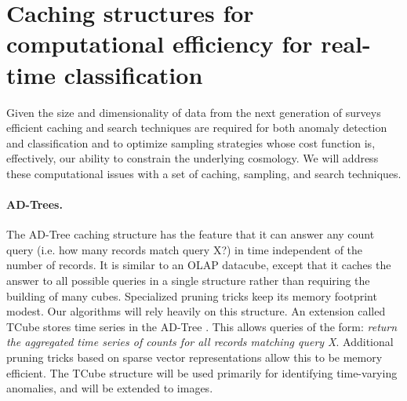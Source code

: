 \documentclass[prd,nofootbib,floatfix,11pt,tightenlines]{revtex4}
\begin{document}
%

\section{Caching structures for computational efficiency for
  real-time classification}
\label{sec:computationalefficiency}

Given the size and dimensionality of data from the next generation of
surveys efficient caching and search techniques are required for both
anomaly detection and classification and to optimize sampling
strategies whose cost function is, effectively, our ability to
constrain the underlying cosmology. We will address these
computational issues with a set of caching, sampling, and search
techniques.

\paragraph{AD-Trees.}
The AD-Tree \cite{Moore97a} caching structure has the feature that it can
answer any count query (i.e. how many records match query X?) in time
independent of the number of records.  It is similar to an OLAP datacube,
except that it caches the answer to all possible queries in a single
structure rather than requiring the building of many cubes.  Specialized
pruning tricks keep its memory footprint modest.  Our algorithms will rely
heavily on this structure. An extension called TCube stores time series in the AD-Tree
\cite{Sabhnani06}.  This allows queries of the form: {\it return the
 aggregated time series of counts for all records matching query X}.
Additional pruning tricks based on sparse vector representations allow this
to be memory efficient.  The TCube structure will be used primarily for
identifying time-varying anomalies, and will be extended to images.
\end{document}

